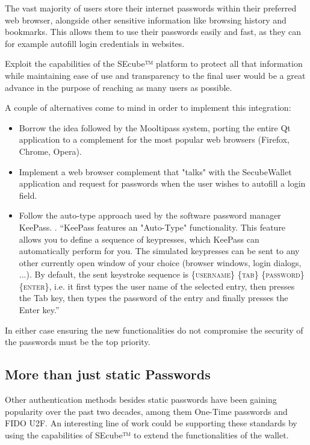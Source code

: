 The vast majority of users store their internet passwords within their preferred web browser, alongside other sensitive information like browsing history and bookmarks. This allows them to use their passwords easily and fast, as they can for example autofill login credentials in websites.

Exploit the capabilities of the SEcube™ platform to protect all that information while maintaining ease of use and transparency to the final user would be a great advance in the purpose of reaching as many users as possible.

A couple of alternatives come to mind in order to implement this integration:
\begin{itemize}
\setlength\itemsep{-3pt}

\item Borrow the idea followed by the Mooltipass system, porting the entire Qt application to a complement for the most popular web browsers (Firefox, Chrome, Opera).
\item Implement a web browser complement that "talks" with the SecubeWallet application and request for passwords when the user wishes to autofill a login field.
\item Follow the auto-type approach used by the software password manager KeePass. \cite{autotype}. ``KeePass features an "Auto-Type" functionality. This feature allows you to define a sequence of keypresses, which KeePass can automatically perform for you. The simulated keypresses can be sent to any other currently open window of your choice (browser windows, login dialogs, ...). By default, the sent keystroke sequence is \{\textsc{username}\} \{\textsc{tab}\} \{\textsc{password}\} \{\textsc{enter}\}, i.e. it first types the user name of the selected entry, then presses the Tab key, then types the password of the entry and finally presses the Enter key.''
\end{itemize}

In either case ensuring the new functionalities do not compromise the security of the passwords must be the top priority.

\subsection{More than just static Passwords}
Other authentication methods besides static passwords have been gaining popularity over the past two decades, among them One-Time passwords and FIDO U2F. An interesting line of work could be supporting these standards by using the capabilities of SEcube™ to extend the functionalities of the wallet.

